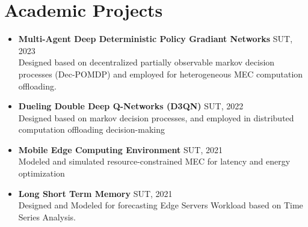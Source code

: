 \documentclass[11pt]{article}
\begin{document}
\section{Academic Projects}

\begin{itemize}
	

		
	
	
	\item \textbf{Multi-Agent Deep Deterministic Policy Gradiant Networks} \hfill SUT, 2023\\
	Designed based on decentralized partially observable markov decision processes (Dec-POMDP) and employed for heterogeneous MEC computation offloading.
	
	
	
	\item \textbf{Dueling Double Deep Q-Networks (D3QN)} \hfill SUT, 2022\\
     Designed based on markov decision processes, and employed in distributed computation offloading decision-making %
	
	
	\item \textbf{Mobile Edge Computing Environment} \hfill SUT, 2021\\
	Modeled and simulated resource-constrained MEC for latency and energy optimization \href{https://github.com/ImanRHT/MEC_Environment}{\faGithub} %
	

	
	\item \textbf{Long Short Term Memory} \hfill SUT, 2021\\
	Designed and Modeled for forecasting Edge Servers Workload based on Time Series Analysis.
	

\end{itemize}
\end{document}
